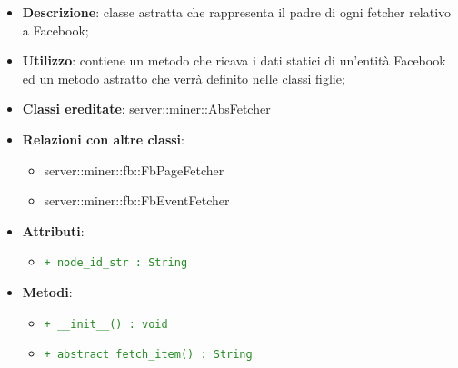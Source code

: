 			\begin{itemize}
				\item \textbf{Descrizione}: classe astratta che rappresenta il padre di ogni fetcher relativo a Facebook;
				\item \textbf{Utilizzo}: contiene un metodo che ricava i dati statici di un'entità Facebook ed un metodo astratto che verrà definito nelle classi figlie;
				\item \textbf{Classi ereditate}: server::miner::AbsFetcher
				\item \textbf{Relazioni con altre classi}:
					\begin{itemize}
						\item server::miner::fb::FbPageFetcher
						\item server::miner::fb::FbEventFetcher
					\end{itemize}
				\item \textbf{Attributi}: 
					\begin{itemize}
						\item \textcolor{forestgreen}{\texttt{+ node\_id\_str : String}}
					\end{itemize}
				\item \textbf{Metodi}:   
					\begin{itemize}
						\item \textcolor{forestgreen}{\texttt{+ \_\_init\_\_() : void}}
						\item \textcolor{forestgreen}{\texttt{+ abstract fetch\_item() : String}}
					\end{itemize}
			\end{itemize}

